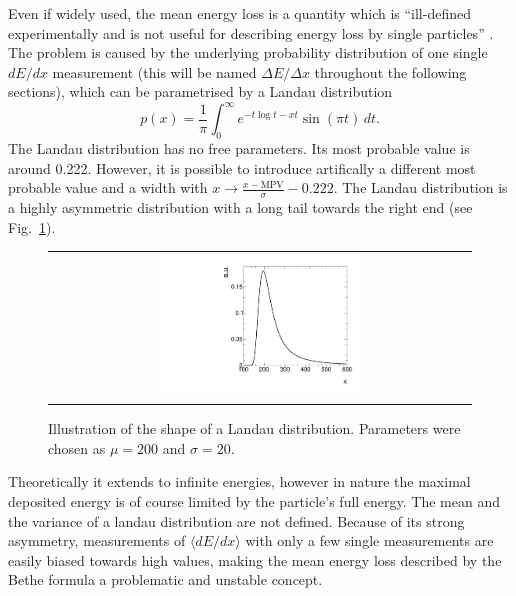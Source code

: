 Even if widely used, the mean energy loss is a quantity which is ``ill-defined experimentally and is not useful for describing energy loss by single particles'' \cite{bib:PDG_2014}.
The problem is caused by the underlying probability distribution of one single $dE/dx$ measurement (this will be named $\Delta E/ \Delta x $ throughout the following sections), which can be parametrised by a Landau distribution \cite{bib:Landau_1944}
\begin{equation*}
p(x) = \frac{1}{\pi} \int_0^\infty\! e^{-t \log t - x t} \sin(\pi t)\, dt.
\end{equation*}
The Landau distribution has no free parameters. Its most probable value is around 0.222.
However, it is possible to introduce artifically a different most probable value and a width with $x \rightarrow \frac{x-\text{MPV}}{\sigma}-0.222$.
The Landau distribution is a highly asymmetric distribution with a long tail towards the right end (see Fig.~\ref{fig:landau}).
\begin{figure}[!t]
  \centering 
  \begin{tabular}{c}
  \includegraphics[width=0.49\textwidth]{figures/analysis/PixelCalibration/Landau.pdf}
  \end{tabular}
  \caption{Illustration of the shape of a Landau distribution. Parameters were chosen as $\mu=200$ and $\sigma=20$.} 
  \label{fig:landau}
\end{figure}
Theoretically it extends to infinite energies, however in nature the maximal deposited energy is of course limited by the particle's full energy.
The mean and the variance of a landau distribution are not defined.
Because of its strong asymmetry, measurements of $\langle dE/dx \rangle$ with only a few single measurements are easily biased towards high values, making the mean energy loss described by the Bethe formula a problematic and unstable concept. 


